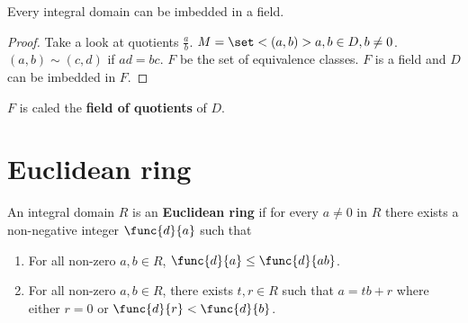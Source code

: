\begin{theorem}
    Every integral domain can be imbedded in a field.
\end{theorem}
\begin{proof}
    Take a look at quotients \(\frac{a}{b}\). \(M = \set<(a,b)>{a,b\in D, b \neq 0}\). \((a,b) \sim (c,d)\) if \(ad = bc\). \(F\) be the set of equivalence classes. \(F\) is a field and \(D\) can be imbedded in \(F\).
\end{proof}
\(F\) is caled the \textbf{field of quotients} of \(D\).

\section{Euclidean ring}
\begin{definition}
    An integral domain \(R\) is an \textbf{Euclidean ring} if for every \(a \neq 0\) in \(R\) there exists a non-negative integer \(\func{d}{a}\) such that 
    \begin{enumerate}
        \item For all non-zero \(a,b \in R\), \(\func{d}{a} \leq \func{d}{ab}\).
        \item For all non-zero \(a,b \in R\), there exists \(t,r \in R\) such that \(a = tb + r\) where either \(r = 0\) or \(\func{d}{r} < \func{d}{b}\).
    \end{enumerate}
\end{definition}